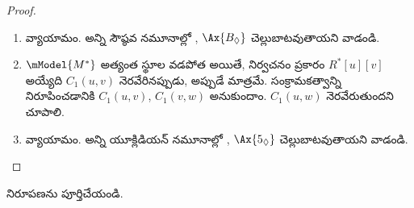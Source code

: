 \documentclass[../../../include/open-logic-section]{subfiles}
\begin{document}
\begin{proof}
\begin{enumerate}
  \item వ్యాయామం. అన్ని సౌష్ఠవ నమూనాల్లో
    , $\Ax{B_\Diamond}$ చెల్లుబాటవుతాయని
    వాడండి.
  \item $\mModel{M^*}$ అత్యంత స్థూల వడపోత అయితే,
    నిర్వచనం ప్రకారం $R^*[u][v]$ అయ్యేది
    $C_1(u,v)$ నెరవేరినప్పుడు, అప్పుడే మాత్రమే. సంక్రామకత్వాన్ని నిరూపించడానికి
    $C_1(u,v)$, $C_1(v,w)$ అనుకుందాం. $C_1(u,w)$
    నెరవేరుతుందని చూపాలి. 
  \item వ్యాయామం. అన్ని యూక్లిడియన్ నమూనాల్లో
    , $\Ax{5_\Diamond}$ చెల్లుబాటవుతాయని
    వాడండి.
\end{enumerate}
\end{proof}

\begin{prob}
  నిరూపణను పూర్తిచేయండి.
\end{prob}
\end{document}
